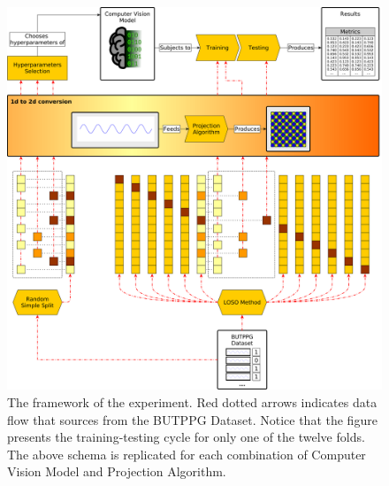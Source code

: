 \begin{figure}
	\includegraphics[width=\textwidth]{img/framework.png}
	\caption{The framework of the experiment. Red dotted arrows indicates data flow that sources from the  BUTPPG Dataset. Notice that the figure presents the training-testing cycle for only one of the twelve folds. The above schema is replicated for each combination of  Computer Vision Model and Projection Algorithm.}
	\label{fig:framework}
\end{figure}
